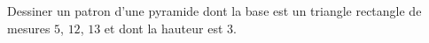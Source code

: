 
\begin{exercice}\label{exo2smath-0190}

    Dessiner un patron d'une pyramide dont la base est un triangle rectangle de mesures \( 5\), \( 12\), \( 13\) et dont la hauteur est \( 3\). 

\end{exercice}
